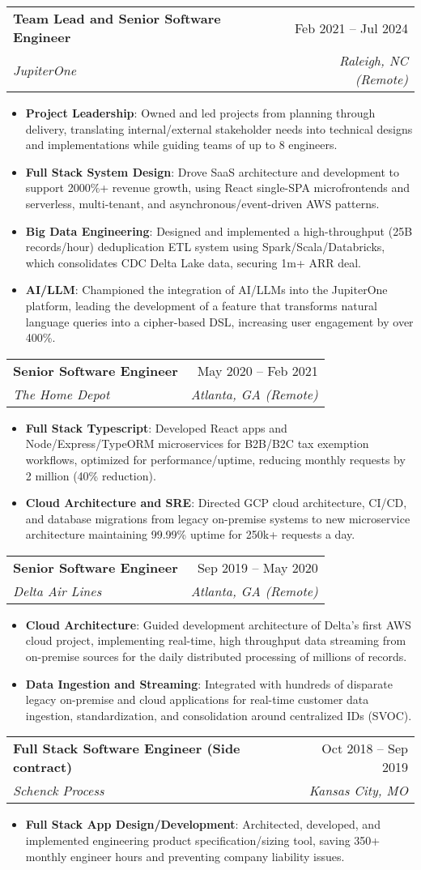 \documentclass[letterpaper,11pt]{article}
\makeatletter
\newcommand{\resumeItem}[1]{
  \item\small{
    {#1 \vspace{-2pt}}
  }
}
\newcommand{\resumeSubheading}[4]{
  \vspace{-2pt}\item
    \begin{tabular*}{0.97\textwidth}[t]{l@{\extracolsep{\fill}}r}
      \textbf{#1} & #2 \\
      \textit{\small#3} & \textit{\small #4} \\
    \end{tabular*}\vspace{-7pt}
}
\newcommand{\resumeItemListStart}{\begin{itemize}}
\newcommand{\resumeItemListEnd}{\end{itemize}\vspace{-5pt}}
\newcommand{\resumeItemTitle}[1]{\textbf{#1}:}
\makeatother
\begin{document}
\resumeSubheading
{Team Lead and Senior Software Engineer}{Feb 2021 -- Jul 2024}
{JupiterOne}{Raleigh, NC (Remote)}
\resumeItemListStart
\resumeItem{\resumeItemTitle{Project Leadership} Owned and led projects from planning through delivery, translating internal/external stakeholder needs into technical designs and implementations while guiding teams of up to 8 engineers.}
\resumeItem{\resumeItemTitle{Full Stack System Design} Drove SaaS architecture and development to support 2000\%+ revenue growth, using React single-SPA microfrontends and serverless, multi-tenant, and asynchronous/event-driven AWS patterns.}
\resumeItem{\resumeItemTitle{Big Data Engineering} Designed and implemented a high-throughput (25B records/hour) deduplication ETL system using Spark/Scala/Databricks, which consolidates CDC Delta Lake data, securing 1m+ ARR deal.}
\resumeItem{\resumeItemTitle{AI/LLM} Championed the integration of AI/LLMs into the JupiterOne platform, leading the development of a feature that transforms natural language queries into a cipher-based DSL, increasing user engagement by over 400\%.}
\resumeItemListEnd

\resumeSubheading
{Senior Software Engineer}{May 2020 -- Feb 2021}
{The Home Depot}{Atlanta, GA (Remote)}
\resumeItemListStart
\resumeItem{\resumeItemTitle{Full Stack Typescript} Developed React apps and Node/Express/TypeORM microservices for B2B/B2C tax exemption workflows, optimized for performance/uptime, reducing monthly requests by 2 million (40\% reduction).}
\resumeItem{\resumeItemTitle{Cloud Architecture and SRE} Directed GCP cloud architecture, CI/CD, and database migrations from legacy on-premise systems to new microservice architecture maintaining 99.99\% uptime for 250k+ requests a day. } 
\resumeItemListEnd

\resumeSubheading
{Senior Software Engineer}{Sep 2019 -- May 2020}
{Delta Air Lines}{Atlanta, GA (Remote)}
\resumeItemListStart
\resumeItem{\resumeItemTitle{Cloud Architecture} Guided development architecture of Delta’s first AWS cloud project, implementing real-time, high throughput data streaming from on-premise sources for the daily distributed processing of millions of records.}
\resumeItem{\resumeItemTitle{Data Ingestion and Streaming} Integrated with hundreds of disparate legacy on-premise and cloud applications for real-time customer data ingestion, standardization, and consolidation around centralized IDs (SVOC).}
\resumeItemListEnd

\resumeSubheading
{Full Stack Software Engineer (Side contract)}{Oct 2018 -- Sep 2019}
{Schenck Process}{Kansas City, MO}
\resumeItemListStart
\resumeItem{\resumeItemTitle{Full Stack App Design/Development} Architected, developed, and implemented engineering product specification/sizing tool, saving 350+ monthly engineer hours and preventing company liability issues.}
\resumeItemListEnd
\end{document}
